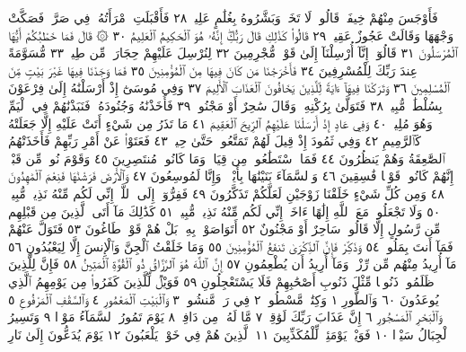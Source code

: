 فَأَوْجَسَ مِنْهُمْ خِيفَةࣰۖ قَالُوا۟ لَا تَخَفْۖ وَبَشَّرُوهُ بِغُلَٰمٍ عَلِيمࣲ ٢٨
فَأَقْبَلَتِ ٱمْرَأَتُهُۥ فِي صَرَّةࣲ فَصَكَّتْ وَجْهَهَا وَقَالَتْ عَجُوزٌ عَقِيمࣱ ٢٩
قَالُوا۟ كَذَٰلِكِ قَالَ رَبُّكِۖ إِنَّهُۥ هُوَ ٱلْحَكِيمُ ٱلْعَلِيمُ ٣٠
۞ قَالَ فَمَا خَطْبُكُمْ أَيُّهَا ٱلْمُرْسَلُونَ ٣١ قَالُوٓا۟ إِنَّآ أُرْسِلْنَآ إِلَىٰ قَوْمࣲ
مُّجْرِمِينَ ٣٢ لِنُرْسِلَ عَلَيْهِمْ حِجَارَةࣰ مِّن طِينࣲ ٣٣ مُّسَوَّمَةً عِندَ رَبِّكَ
لِلْمُسْرِفِينَ ٣٤ فَأَخْرَجْنَا مَن كَانَ فِيهَا مِنَ ٱلْمُؤْمِنِينَ ٣٥ فَمَا وَجَدْنَا
فِيهَا غَيْرَ بَيْتࣲ مِّنَ ٱلْمُسْلِمِينَ ٣٦ وَتَرَكْنَا فِيهَآ ءَايَةࣰ لِّلَّذِينَ يَخَافُونَ
ٱلْعَذَابَ ٱلْأَلِيمَ ٣٧ وَفِي مُوسَىٰٓ إِذْ أَرْسَلْنَٰهُ إِلَىٰ فِرْعَوْنَ بِسُلْطَٰنࣲ
مُّبِينࣲ ٣٨ فَتَوَلَّىٰ بِرُكْنِهِۦ وَقَالَ سَٰحِرٌ أَوْ مَجْنُونࣱ ٣٩ فَأَخَذْنَٰهُ وَجُنُودَهُۥ
فَنَبَذْنَٰهُمْ فِي ٱلْيَمِّ وَهُوَ مُلِيمࣱ ٤٠ وَفِي عَادٍ إِذْ أَرْسَلْنَا عَلَيْهِمُ ٱلرِّيحَ
ٱلْعَقِيمَ ٤١ مَا تَذَرُ مِن شَيْءٍ أَتَتْ عَلَيْهِ إِلَّا جَعَلَتْهُ كَٱلرَّمِيمِ ٤٢
وَفِي ثَمُودَ إِذْ قِيلَ لَهُمْ تَمَتَّعُوا۟ حَتَّىٰ حِينࣲ ٤٣ فَعَتَوْا۟ عَنْ أَمْرِ رَبِّهِمْ
فَأَخَذَتْهُمُ ٱلصَّٰعِقَةُ وَهُمْ يَنظُرُونَ ٤٤ فَمَا ٱسْتَطَٰعُوا۟ مِن قِيَامࣲ
وَمَا كَانُوا۟ مُنتَصِرِينَ ٤٥ وَقَوْمَ نُوحࣲ مِّن قَبْلُۖ إِنَّهُمْ كَانُوا۟ قَوْمࣰا
فَٰسِقِينَ ٤٦ وَٱلسَّمَآءَ بَنَيْنَٰهَا بِأَيْي۟دࣲ وَإِنَّا لَمُوسِعُونَ ٤٧ وَٱلْأَرْضَ
فَرَشْنَٰهَا فَنِعْمَ ٱلْمَٰهِدُونَ ٤٨ وَمِن كُلِّ شَيْءٍ خَلَقْنَا زَوْجَيْنِ
لَعَلَّكُمْ تَذَكَّرُونَ ٤٩ فَفِرُّوٓا۟ إِلَى ٱللَّهِۖ إِنِّي لَكُم مِّنْهُ نَذِيرࣱ مُّبِينࣱ ٥٠
وَلَا تَجْعَلُوا۟ مَعَ ٱللَّهِ إِلَٰهًا ءَاخَرَۖ إِنِّي لَكُم مِّنْهُ نَذِيرࣱ مُّبِينࣱ ٥١
كَذَٰلِكَ مَآ أَتَى ٱلَّذِينَ مِن قَبْلِهِم مِّن رَّسُولٍ إِلَّا قَالُوا۟ سَاحِرٌ
أَوْ مَجْنُونٌ ٥٢ أَتَوَاصَوْا۟ بِهِۦۚ بَلْ هُمْ قَوْمࣱ طَاغُونَ ٥٣ فَتَوَلَّ عَنْهُمْ
فَمَآ أَنتَ بِمَلُومࣲ ٥٤ وَذَكِّرْ فَإِنَّ ٱلذِّكْرَىٰ تَنفَعُ ٱلْمُؤْمِنِينَ ٥٥ وَمَا
خَلَقْتُ ٱلْجِنَّ وَٱلْإِنسَ إِلَّا لِيَعْبُدُونِ ٥٦ مَآ أُرِيدُ مِنْهُم مِّن رِّزْقࣲ
وَمَآ أُرِيدُ أَن يُطْعِمُونِ ٥٧ إِنَّ ٱللَّهَ هُوَ ٱلرَّزَّاقُ ذُو ٱلْقُوَّةِ ٱلْمَتِينُ ٥٨
فَإِنَّ لِلَّذِينَ ظَلَمُوا۟ ذَنُوبࣰا مِّثْلَ ذَنُوبِ أَصْحَٰبِهِمْ فَلَا
يَسْتَعْجِلُونِ ٥٩ فَوَيْلࣱ لِّلَّذِينَ كَفَرُوا۟ مِن يَوْمِهِمُ ٱلَّذِي يُوعَدُونَ ٦٠
وَٱلطُّورِ ١ وَكِتَٰبࣲ مَّسْطُورࣲ ٢ فِي رَقࣲّ مَّنشُورࣲ ٣ وَٱلْبَيْتِ
ٱلْمَعْمُورِ ٤ وَٱلسَّقْفِ ٱلْمَرْفُوعِ ٥ وَٱلْبَحْرِ ٱلْمَسْجُورِ ٦ إِنَّ
عَذَابَ رَبِّكَ لَوَٰقِعࣱ ٧ مَّا لَهُۥ مِن دَافِعࣲ ٨ يَوْمَ تَمُورُ ٱلسَّمَآءُ
مَوْرࣰا ٩ وَتَسِيرُ ٱلْجِبَالُ سَيْرࣰا ١٠ فَوَيْلࣱ يَوْمَئِذࣲ لِّلْمُكَذِّبِينَ ١١
ٱلَّذِينَ هُمْ فِي خَوْضࣲ يَلْعَبُونَ ١٢ يَوْمَ يُدَعُّونَ إِلَىٰ نَارِ
